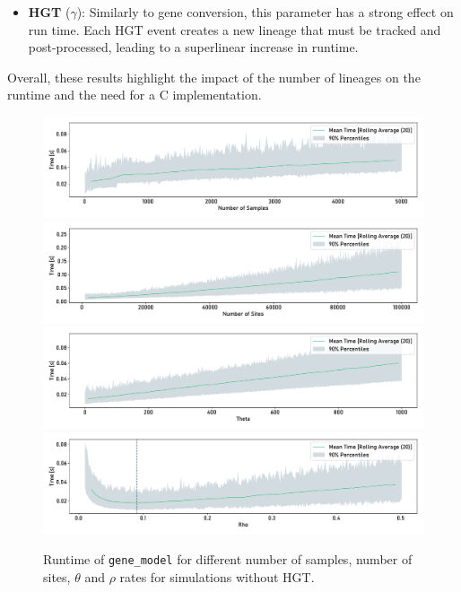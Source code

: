 \begin{itemize}
    \item \textbf{HGT} ($\gamma$): Similarly to gene conversion, this parameter has a strong effect on run time. Each \ac{HGT} event creates a new lineage that must be tracked and post-processed, leading to a superlinear increase in runtime.
\end{itemize}

Overall, these results highlight the impact of the number of lineages on the runtime and the need for a C implementation.
\begin{figure}[H]
    \begin{flushright}
        \includegraphics[width=\textwidth]{figures/runtime/num_samples.pdf}\\
        \includegraphics[width=\textwidth]{figures/runtime/num_sites.pdf}\\
        \includegraphics[width=\textwidth]{figures/runtime/theta.pdf}\\
        \includegraphics[width=\textwidth]{figures/runtime/rho.pdf}\\
    \end{flushright}
    \centering
    \caption[Runtime without HGT.]{Runtime of \texttt{gene_model} for different number of samples, number of sites, $\theta$ and $\rho$ rates
        for simulations without HGT.}
    \label{fig:runtime}
\end{figure}

